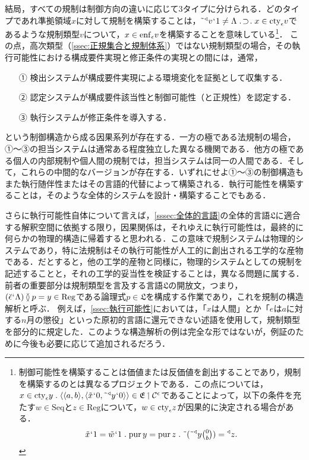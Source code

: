 結局，すべての規制は制御方向の違いに応じて3タイプに分けられる．どのタイプであれ準拠領域$x$に対して規制を構築することは，$ \tildel{\trgl{v}}\fap 1 \neq\Lambda \case{1}{1}{1}x\in\cty{\epsilon}v $であるような規制類型$v$について，$ x\in\mathrm{enf}_{\epsilon}v $を構築することを意味している\footnote{
    制御可能性を構築することは価値または反価値を創出することであり，規制を構築するのとは異なるプロジェクトである．この点については，
    $ x\in\cty{\epsilon}y \con{1} \orp{\orp{a,b},\orp{\tilde{x}\fap 0,\tildel{\trgl{y}}\fap 0}}\in \mathfrak{E}\uphl\mathcal{C}^\epsilon $であることによって，以下の条件を充たす$ w\in\mathrm{Seq} $と$ z\in\mathrm{Reg} $について，$ w\in \mathrm{cty}_{\epsilon}z $が因果的に決定される場合がある．
    \[
        \tilde{x}\fap 1 = \tilde{w}\fap 1\con{1}\mathrm{pur}\,y = \mathrm{pur}\,z\con{1}\tildel{(\tildel{\trgl{y}}\tbinom{0}{b})} = \trgl{z}.
    \]}．
この点，高次類型（\ref{ssec:正規集合と規制体系}）ではない規制類型の場合，その執行可能性における構成要件実現と修正条件の実現との間には，通常，
\begin{enumerate}
    \item[①] 検出システムが構成要件実現による環境変化を証拠として収集する．
    \item[②] 認定システムが構成要件該当性と制御可能性（と正規性）を認定する．
    \item[③] 執行システムが修正条件を導入する．
\end{enumerate}
という制御構造から成る因果系列が存在する．一方の極である法規制の場合，①〜③の担当システムは通常ある程度独立した異なる機関である．他方の極である個人の内部規制や個人間の規制では，担当システムは同一の人間である．そして，これらの中間的なバージョンが存在する．いずれにせよ①〜③の制御構造もまた執行随伴性またはその言語的代替によって構築される．執行可能性を構築することは，そのような全体的システムを設計・構築することでもある．

さらに執行可能性自体について言えば，\ref{sssec:全体的言語}の全体的言語$\mathfrak{L}$に適合する解釈空間に依拠する限り，因果関係は，それゆえに執行可能性は，最終的に何らかの物理的構造に帰着すると思われる．この意味で規制システムは物理的システムであり，特に法規制はその執行可能性が人工的に創出される工学的な産物である．だとすると，他の工学的産物と同様に，物理的システムとしての規制を記述することと，それの工学的妥当性を検証することは，異なる問題に属する．前者の重要部分は規制類型を言及する言語$\mathfrak{L}$の開放文，つまり，$ (\breve{\epsilon}{\mspace{1mu}{`}\mspace{1mu}}\Lambda)\mathbin{\between} p = y\in\mathrm{Reg} $である論理式$p\in\mathfrak{L}$を構成する作業であり，これを規制の構造解析と呼ぶ．
例えば，\ref{ssec:執行可能性}においては，「$x$は人間」とか「$e$は$a$に対する$n$月の懲役」といった原初的言語に還元できない述語を使用して，規制類型を部分的に規定した．このような構造解析の例は完全な形ではないが，例証のために今後も必要に応じて追加されるだろう．

